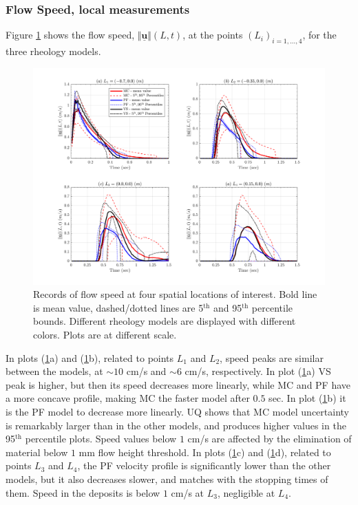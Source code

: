 \documentclass{article}
\begin{document}
\subsubsection{Flow Speed, local measurements}
Figure \ref{fig:Ramp-Vel} shows the flow speed, $\Vert \underline{\mathbf{u}} \Vert(L,t)$, at the points $(L_i)_{i=1,\dots,4}$, for the three rheology models.
\begin{figure}[H]
         \centering
        \includegraphics[width=1\textwidth]{InclinedPlane/LocalMeasurments/Velocity_Inc.png}
        \caption{Records of flow speed at four spatial locations of interest. Bold line is mean value, dashed/dotted lines are 5$^{\mathrm{th}}$ and 95$^{\mathrm{th}}$ percentile bounds. Different rheology models are displayed with different colors. Plots are at different scale.}
        \label{fig:Ramp-Vel}
\end{figure}
In plots (\ref{fig:Ramp-Vel}a) and (\ref{fig:Ramp-Vel}b), related to points $L_1$ and $L_2$, speed peaks are similar between the models, at $\sim 10$ cm/s and $\sim 6$ cm/s, respectively. In plot (\ref{fig:Ramp-Vel}a) VS peak is higher, but then its speed decreases more linearly, while MC and PF have a more concave profile, making MC the faster model after $0.5$ sec. In plot (\ref{fig:Ramp-Vel}b) it is the PF model to decrease more linearly. UQ shows that MC model uncertainty is remarkably larger than in the other models, and produces higher values in the 95$^{\mathrm{th}}$ percentile plots. Speed values below $1$ cm/s are affected by the elimination of material below $1$ mm flow height threshold. In plots (\ref{fig:Ramp-Vel}c) and (\ref{fig:Ramp-Vel}d), related to points $L_3$ and $L_4$, the PF velocity profile is significantly lower than the other models, but it also decreases slower, and matches with the stopping times of them. Speed in the deposits is below $1$ cm/s at $L_3$, negligible at $L_4$.
\end{document}
